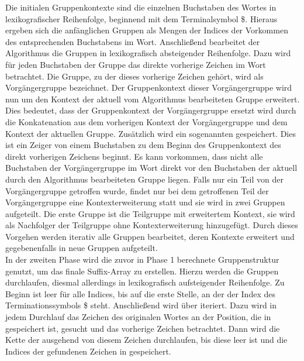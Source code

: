 Die initialen Gruppenkontexte sind die einzelnen Buchstaben des Wortes in lexikografischer Reihenfolge, beginnend mit dem Terminalsymbol \$.
Hieraus ergeben sich die anfänglichen Gruppen als Mengen der Indices der Vorkommen des entsprechenden Buchstabens im Wort.
Anschließend bearbeitet der Algorithmus die Gruppen in lexikografisch absteigender Reihenfolge. 
Dazu wird für jeden Buchstaben der Gruppe das direkte vorherige Zeichen im Wort betrachtet.
Die Gruppe, zu der dieses vorherige Zeichen gehört, wird als Vorgängergruppe bezeichnet.
Der Gruppenkontext dieser Vorgängergruppe wird nun um den Kontext der aktuell vom Algorithmus bearbeiteten Gruppe erweitert.
Dies bedeutet, dass der Gruppenkontext der Vorgängergruppe ersetzt wird durch die Konkatenation aus dem vorherigen Kontext der Vorgängergruppe und dem Kontext der aktuellen Gruppe.
Zusätzlich wird ein sogenannten \prevpointer gespeichert.
Dies ist ein Zeiger von einem Buchstaben zu dem Beginn des Gruppenkontext des direkt vorherigen Zeichens beginnt.
Es kann vorkommen, dass nicht alle Buchstaben der Vorgängergruppe im Wort direkt vor den Buchstaben der aktuell durch den Algorithmus bearbeiteten Gruppe liegen.
Falls nur ein Teil von der Vorgängergruppe getroffen wurde, findet nur bei dem getroffenen Teil der Vorgängergruppe eine Kontexterweiterung statt und sie wird in zwei Gruppen aufgeteilt.
Die erste Gruppe ist die Teilgruppe mit erweitertem Kontext, sie wird als Nachfolger der Teilgruppe ohne Kontexterweiterung hinzugefügt. 
Durch dieses Vorgehen werden iterativ alle Gruppen bearbeitet, deren Kontexte erweitert und gegebenenfalls in neue Gruppen aufgeteilt.\\

In der zweiten Phase wird die zuvor in Phase 1 berechnete Gruppenstruktur genutzt, um das finale Suffix-Array zu erstellen. 
Hierzu werden die Gruppen durchlaufen, diesmal allerdings in lexikografisch aufsteigender Reihenfolge.
Zu Beginn ist \sa leer für alle Indices, bis auf die erste Stelle, an der der Index des Terminationssymbols \$ steht.
Anschließend wird über \sa iteriert.
Dazu wird in jedem Durchlauf das Zeichen des originalen Wortes an der Position, die in \sa gespeichert ist, gesucht und das vorherige Zeichen betrachtet. 
Dann wird die Kette der \prevpointer ausgehend von diesem Zeichen durchlaufen, bis diese leer ist und die Indices der gefundenen Zeichen in \sa gespeichert. 